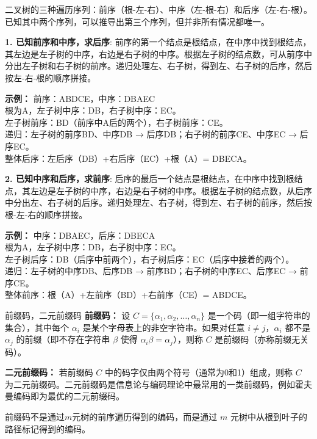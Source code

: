 二叉树的三种遍历序列：前序（根-左-右）、中序（左-根-右）和后序（左-右-根）。已知其中两个序列，可以推导出第三个序列，但并非所有情况都唯一。

    \textbf{1. 已知前序和中序，求后序}:
    前序的第一个结点是根结点，在中序中找到根结点，其左边是左子树的中序，右边是右子树的中序。根据左子树的结点数，可从前序中分出左子树和右子树的前序。递归处理左、右子树，得到左、右子树的后序，然后按左-右-根的顺序拼接。

    \textbf{示例：}
    前序：ABDCE，中序：DBAEC \\
    根为A，左子树中序：DB，右子树中序：EC。 \\
    左子树前序：BD（前序中A后的两个），右子树前序：CE。 \\
    递归：左子树的前序BD、中序DB → 后序DB；右子树的前序CE、中序EC → 后序EC。 \\
    整体后序：左后序（DB）+右后序（EC）+根（A）= DBECA。

    \textbf{2. 已知中序和后序，求前序}:
    后序的最后一个结点是根结点，在中序中找到根结点，其左边是左子树的中序，右边是右子树的中序。根据左子树的结点数，从后序中分出左、右子树的后序。递归处理左、右子树，得到左、右子树的前序，然后按根-左-右的顺序拼接。

    \textbf{示例：}
    中序：DBAEC，后序：DBECA \\
    根为A，左子树中序：DB，右子树中序：EC。 \\
    左子树后序：DB（后序中前两个），右子树后序：EC（后序中接着的两个）。 \\
    递归：左子树的中序DB、后序DB → 前序BD；右子树的中序EC、后序EC → 前序CE。 \\
    整体前序：根（A）+左前序（BD）+右前序（CE）= ABDCE。

\begin{definition}{前缀码，二元前缀码}{}
\textbf{前缀码：} 设 $C = \{\alpha_1, \alpha_2, \dots, \alpha_n\}$ 是一个码（即一组字符串的集合），其中每个 $\alpha_i$ 是某个字母表上的非空字符串。如果对任意 $i \neq j$，$\alpha_i$ 都不是 $\alpha_j$ 的前缀（即不存在字符串 $\beta$ 使得 $\alpha_i \beta = \alpha_j$），则称 $C$ 是前缀码（亦称前缀无关码）。

\textbf{二元前缀码：} 若前缀码 $C$ 中的码字仅由两个符号（通常为0和1）组成，则称 $C$ 为二元前缀码。二元前缀码是信息论与编码理论中最常用的一类前缀码，例如霍夫曼编码即为最优的二元前缀码。
\end{definition}
前缀码不是通过$m$元树的前序遍历得到的编码，而是通过 $m$ 元树中从根到叶子的路径标记得到的编码。

